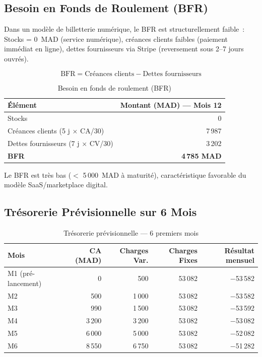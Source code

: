 \documentclass[12pt,a4paper,openany]{report}
\begin{document}
\subsection{Besoin en Fonds de Roulement (BFR)}

Dans un modèle de billetterie numérique, le BFR est structurellement faible~: Stocks = 0~MAD (service numérique), créances clients faibles (paiement immédiat en ligne), dettes fournisseurs via Stripe (reversement sous 2–7 jours ouvrés).

\[ \text{BFR} = \text{Créances clients} - \text{Dettes fournisseurs} \]

\begin{table}[H]
\centering
\small
\begin{tabular}{lr}
\toprule
\textbf{Élément} & \textbf{Montant (MAD) — Mois 12} \\
\midrule
Stocks                          & 0 \\
Créances clients (5 j × CA/30) & 7\,987 \\
Dettes fournisseurs (7 j × CV/30) & 3\,202 \\
\midrule
\textbf{BFR}                   & \textbf{4\,785 MAD} \\
\bottomrule
\end{tabular}
\caption{Besoin en fonds de roulement (BFR)}
\label{tab:bfr}
\end{table}

\noindent Le BFR est très bas ($<$ 5\,000~MAD à maturité), caractéristique favorable du modèle SaaS/marketplace digital.

\subsection{Trésorerie Prévisionnelle sur 6 Mois}

\begin{table}[H]
\centering
\small
\begin{tabular}{lrrrr}
\toprule
\textbf{Mois} & \textbf{CA (MAD)} & \textbf{Charges Var.} & \textbf{Charges Fixes} & \textbf{Résultat mensuel} \\
\midrule
M1 (pré-lancement) & 0     & 500    & 53\,082 & $-$53\,582 \\
M2                 & 500   & 1\,000 & 53\,082 & $-$53\,582 \\
M3                 & 990   & 1\,500 & 53\,082 & $-$53\,592 \\
M4                 & 3\,200& 3\,200 & 53\,082 & $-$53\,082 \\
M5                 & 6\,000& 5\,000 & 53\,082 & $-$52\,082 \\
M6                 & 8\,550& 6\,750 & 53\,082 & $-$51\,282 \\
\bottomrule
\end{tabular}
\caption{Trésorerie prévisionnelle — 6 premiers mois}
\label{tab:tresorerie}
\end{table}
\end{document}
